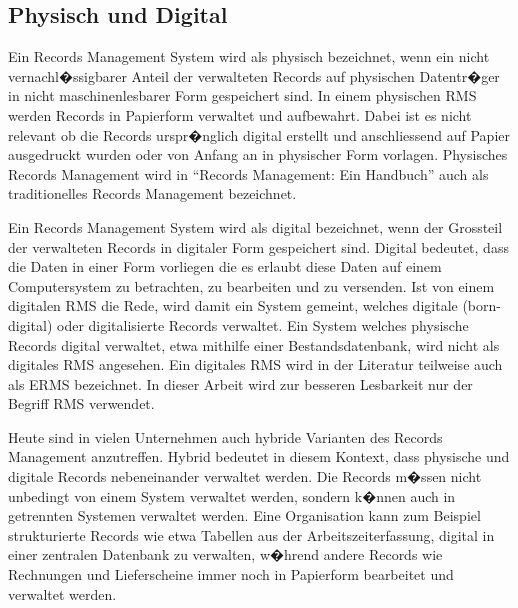 \documentclass[a4paper,twoside,10pt]{report}
\begin{document}
\subsection{Physisch und Digital}\label{subsec:defphydig}
Ein Records Management System wird als physisch bezeichnet, wenn ein nicht vernachl�ssigbarer Anteil der verwalteten Records auf physischen Datentr�ger in nicht maschinenlesbarer Form gespeichert sind. In einem physischen \ac{RMS} werden Records in Papierform verwaltet und aufbewahrt. Dabei ist es nicht relevant ob die Records urspr�nglich digital erstellt und anschliessend auf Papier ausgedruckt wurden oder von Anfang an in physischer Form vorlagen. Physisches Records Management wird in "`Records Management: Ein Handbuch"' auch als traditionelles Records Management bezeichnet. \cite{rmHandbook}

Ein Records Management System wird als digital bezeichnet, wenn der Grossteil der verwalteten Records in digitaler Form gespeichert sind. Digital bedeutet, dass die Daten in einer Form vorliegen die es erlaubt diese Daten auf einem Computersystem zu betrachten, zu bearbeiten und zu versenden. Ist von einem digitalen \ac{RMS} die Rede, wird damit ein System gemeint, welches digitale (born-digital) oder digitalisierte Records verwaltet. Ein System welches physische Records digital verwaltet, etwa mithilfe einer Bestandsdatenbank, wird nicht als digitales \ac{RMS} angesehen. Ein digitales \ac{RMS} wird in der Literatur teilweise auch als \ac{ERMS} bezeichnet. In dieser Arbeit wird zur besseren Lesbarkeit nur der Begriff \ac{RMS} verwendet.

Heute sind in vielen Unternehmen auch hybride Varianten des Records Management anzutreffen. Hybrid bedeutet in diesem Kontext, dass physische und digitale Records nebeneinander verwaltet werden. Die Records m�ssen nicht unbedingt von einem System verwaltet werden, sondern k�nnen auch in getrennten Systemen verwaltet werden. Eine Organisation kann zum Beispiel strukturierte Records wie etwa Tabellen aus der Arbeitszeiterfassung, digital in einer zentralen Datenbank zu verwalten, w�hrend andere Records wie Rechnungen und Lieferscheine immer noch in Papierform bearbeitet und verwaltet werden. \cite{rmHandbook}
\end{document}
